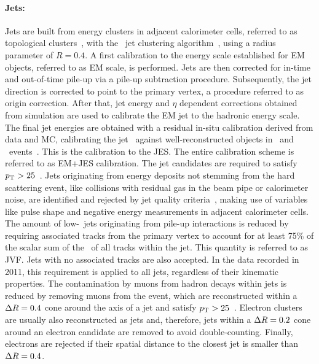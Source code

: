 %
\paragraph{Jets:}\mbox{}
Jets are built from energy clusters in adjacent calorimeter cells, referred to as topological clusters~\cite{Lampl:1099735}, with the \antikt\ jet clustering algorithm~\cite{CAC-0801}, using a radius parameter of $R=0.4$. 
%
A first calibration to the energy scale established for \gls{EM} objects, referred to as \gls{EM} scale, is performed. 
%
Jets are then corrected for in-time and out-of-time pile-up via a pile-up subtraction procedure. 
%
Subsequently, the jet direction is corrected to point to the primary vertex, a procedure referred to as origin correction. After that, jet energy and $\eta$ dependent corrections obtained from simulation are used to calibrate the \gls{EM} jet to the hadronic energy scale. 
%
The final jet energies are obtained with a residual in-situ calibration derived from data and \gls{MC}, calibrating the jet \pt\ against well-reconstructed objects in \Zj\ and \Gammaj\ events~\cite{ATLASCollaboration2015b}. This is the calibration to the \gls{JES}.
%
The entire calibration scheme is referred to as \gls{EM}+\gls{JES} calibration.
%
The jet candidates are required to satisfy $p_\mathrm{T}>25$~\GeV.
%
Jets originating from energy deposits not stemming from the hard scattering event, like collisions with residual gas in the beam pipe or calorimeter noise, are identified and rejected by jet quality criteria~\cite{ATLAS-CONF-2012-20}, making use of variables like pulse shape and negative energy measurements in adjacent calorimeter cells.
The amount of low-\pt\ jets originating from pile-up interactions is reduced by requiring associated tracks from the primary vertex to account for at least 75\% of the scalar sum of the \pt\ of all tracks within the jet. This quantity is referred to as \gls{JVF}. Jets with no associated tracks are also accepted. In the data recorded in 2011, this requirement is applied to all jets, regardless of their kinematic properties.
%
The contamination by muons from hadron decays within jets is reduced by removing muons from the event, which are reconstructed within a $\Delta R=0.4$ cone around the axis of a jet and satisfy $p_\mathrm{T}>25$~\GeV. 
%
Electron clusters are usually also reconstructed as jets and, therefore, jets within a $\Delta R=0.2$ cone around an electron candidate are removed to avoid double-counting. 
%
Finally, electrons are rejected if their spatial distance to the closest jet is smaller than $\Delta R=0.4$.


